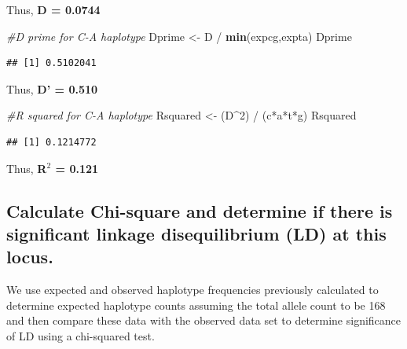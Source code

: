 \documentclass[]{article}
\newenvironment{Shaded}{\begin{snugshade}}{\end{snugshade}}
\newcommand{\KeywordTok}[1]{\textcolor[rgb]{0.13,0.29,0.53}{\textbf{{#1}}}}
\newcommand{\DecValTok}[1]{\textcolor[rgb]{0.00,0.00,0.81}{{#1}}}
\newcommand{\StringTok}[1]{\textcolor[rgb]{0.31,0.60,0.02}{{#1}}}
\newcommand{\CommentTok}[1]{\textcolor[rgb]{0.56,0.35,0.01}{\textit{{#1}}}}
\newcommand{\NormalTok}[1]{{#1}}
\begin{document}
Thus, \textbf{D = 0.0744}

\begin{Shaded}
\begin{Highlighting}[]
\CommentTok{#D prime for C-A haplotype}
\NormalTok{Dprime <-}\StringTok{ }\NormalTok{D /}\StringTok{ }\KeywordTok{min}\NormalTok{(expcg,expta)}
\NormalTok{Dprime}
\end{Highlighting}
\end{Shaded}

\begin{verbatim}
## [1] 0.5102041
\end{verbatim}

Thus, \textbf{D' = 0.510}

\begin{Shaded}
\begin{Highlighting}[]
\CommentTok{#R squared for C-A haplotype}
\NormalTok{Rsquared <-}\StringTok{ }\NormalTok{(D^}\DecValTok{2}\NormalTok{) /}\StringTok{ }\NormalTok{(c*a*t*g)}
\NormalTok{Rsquared}
\end{Highlighting}
\end{Shaded}

\begin{verbatim}
## [1] 0.1214772
\end{verbatim}

Thus, \textbf{R$^2$ = 0.121}

\subsection{Calculate Chi-square and determine if there is significant
linkage disequilibrium (LD) at this
locus.}\label{calculate-chi-square-and-determine-if-there-is-significant-linkage-disequilibrium-ld-at-this-locus.}

We use expected and observed haplotype frequencies previously calculated
to determine expected haplotype counts assuming the total allele count
to be 168 and then compare these data with the observed data set to
determine significance of LD using a chi-squared test.
\end{document}
